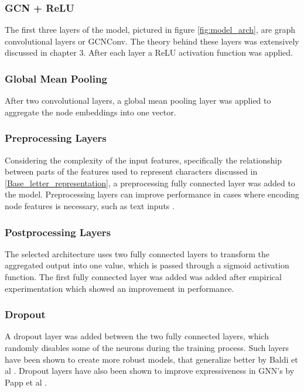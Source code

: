 
\subsubsection{GCN + ReLU}
The first three layers of the model, pictured in figure \ref{fig:model_arch}, are graph convolutional layers or GCNConv. The theory behind these layers was extensively discussed in chapter 3. After each layer a ReLU activation function was applied.

\subsubsection{Global Mean Pooling}
After two convolutional layers, a global mean pooling layer was applied to aggregate the node embeddings into one vector. 


\subsubsection{Preprocessing Layers}
Considering the complexity of the input features, specifically the relationship between parts of the features used to represent characters discussed in \ref{Base_letter_representation}, a preprocessing fully connected layer was added to the model. Preprocessing layers can improve performance in cases where encoding node features is necessary, such as text inputs \cite{Lesk2024}.

\subsubsection{Postprocessing Layers}
The selected architecture uses two fully connected layers to transform the aggregated output into one value, 
which is passed through a sigmoid activation function. The first fully connected layer was added was added after empirical experimentation which showed an improvement in performance.



\subsubsection{Dropout}
A dropout layer was added between the two fully connected layers, which randomly disables some of the neurons during the training process. Such layers have been shown to create more robust models, that generalize better by Baldi et al \cite{NIPS2013_71f6278d}. Dropout layers have also been shown to improve expressiveness in GNN's by Papp et al \cite{NEURIPS2021_b8b2926b}.

